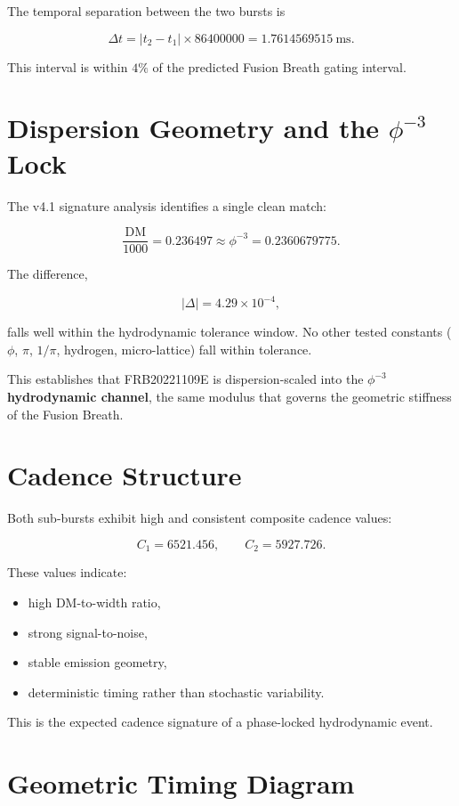 \documentclass[12pt]{report}
\begin{document}
The temporal separation between the two bursts is


\[
\Delta t = |t_2 - t_1|\times 86400000
         = 1.7614569515\ \text{ms}.
\]



This interval is within $4\%$ of the predicted Fusion Breath gating interval.

\section{Dispersion Geometry and the $\phi^{-3}$ Lock}

The v4.1 signature analysis identifies a single clean match:


\[
\frac{\text{DM}}{1000} = 0.236497 \approx \phi^{-3} = 0.2360679775.
\]



The difference,


\[
|\Delta| = 4.29\times 10^{-4},
\]


falls well within the hydrodynamic tolerance window. No other tested constants
($\phi$, $\pi$, $1/\pi$, hydrogen, micro-lattice) fall within tolerance.

This establishes that FRB20221109E is dispersion-scaled into the
\textbf{$\phi^{-3}$ hydrodynamic channel}, the same modulus that governs the
geometric stiffness of the Fusion Breath.

\section{Cadence Structure}

Both sub-bursts exhibit high and consistent composite cadence values:


\[
C_1 = 6521.456,\qquad C_2 = 5927.726.
\]



These values indicate:
\begin{itemize}
    \item high DM-to-width ratio,
    \item strong signal-to-noise,
    \item stable emission geometry,
    \item deterministic timing rather than stochastic variability.
\end{itemize}

This is the expected cadence signature of a phase-locked hydrodynamic event.

\section{Geometric Timing Diagram}
\end{document}
